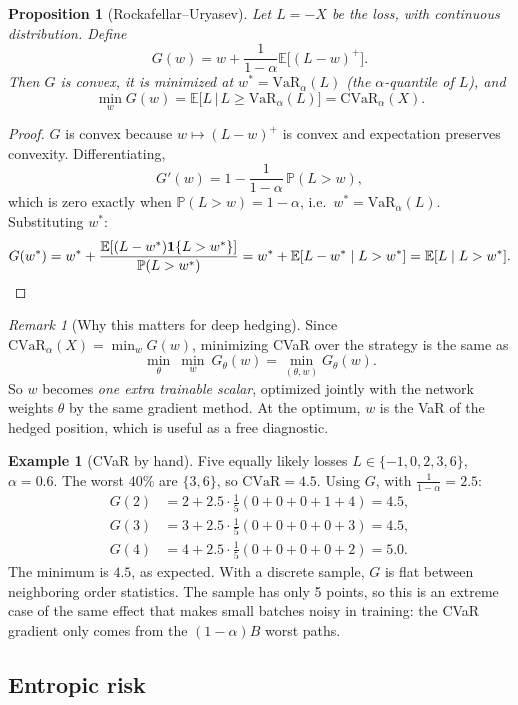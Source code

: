 \documentclass[11pt]{article}
\newtheorem{proposition}[theorem]{Proposition}
\theoremstyle{definition}
\newtheorem{example}[theorem]{Example}
\theoremstyle{remark}
\newtheorem{remark}[theorem]{Remark}
\newcommand{\E}{\mathbb{E}}
\newcommand{\CVaR}{\mathrm{CVaR}}
\newcommand{\VaR}{\mathrm{VaR}}
\begin{document}
\begin{proposition}[Rockafellar--Uryasev]
Let $L=-X$ be the loss, with continuous distribution. Define
\[
G(w)=w+\frac{1}{1-\alpha}\E\bigl[(L-w)^+\bigr].
\]
Then $G$ is convex, it is minimized at $w^*=\VaR_\alpha(L)$ (the $\alpha$-quantile of $L$), and
\[
\min_w G(w)=\E\bigl[L\,\big|\,L\ge\VaR_\alpha(L)\bigr]=\CVaR_\alpha(X).
\]
\end{proposition}

\begin{proof}
$G$ is convex because $w\mapsto(L-w)^+$ is convex and expectation preserves convexity. Differentiating,
\[
G'(w)=1-\frac{1}{1-\alpha}\,\mathbb P(L>w),
\]
which is zero exactly when $\mathbb P(L>w)=1-\alpha$, i.e.\ $w^*=\VaR_\alpha(L)$. Substituting $w^*$:
\[
G(w^*)=w^*+\frac{\E[(L-w^*)\mathbf 1\{L>w^*\}]}{\mathbb P(L>w^*)}
=w^*+\E[L-w^*\mid L>w^*]=\E[L\mid L>w^*]. \qedhere
\]
\end{proof}

\begin{remark}[Why this matters for deep hedging]
Since $\CVaR_\alpha(X)=\min_w G(w)$, minimizing CVaR over the strategy is the same as
\[
\min_{\theta}\ \min_w\ G_\theta(w)=\min_{(\theta,w)}G_\theta(w).
\]
So $w$ becomes \emph{one extra trainable scalar}, optimized jointly with the network weights $\theta$ by the same
gradient method. At the optimum, $w$ is the VaR of the hedged position, which is useful as a free diagnostic.
\end{remark}

\begin{example}[CVaR by hand]
Five equally likely losses $L\in\{-1,0,2,3,6\}$, $\alpha=0.6$. The worst $40\%$ are $\{3,6\}$, so $\CVaR=4.5$.
Using $G$, with $\tfrac1{1-\alpha}=2.5$:
\begin{align*}
G(2)&=2+2.5\cdot\tfrac15(0+0+0+1+4)=4.5,\\
G(3)&=3+2.5\cdot\tfrac15(0+0+0+0+3)=4.5,\\
G(4)&=4+2.5\cdot\tfrac15(0+0+0+0+2)=5.0 .
\end{align*}
The minimum is $4.5$, as expected. With a discrete sample, $G$ is flat between neighboring order statistics.
The sample has only 5 points, so this is an extreme case of the same effect that makes small batches
noisy in training: the CVaR gradient only comes from the $(1-\alpha)B$ worst paths.
\end{example}

\subsection{Entropic risk}
\end{document}
